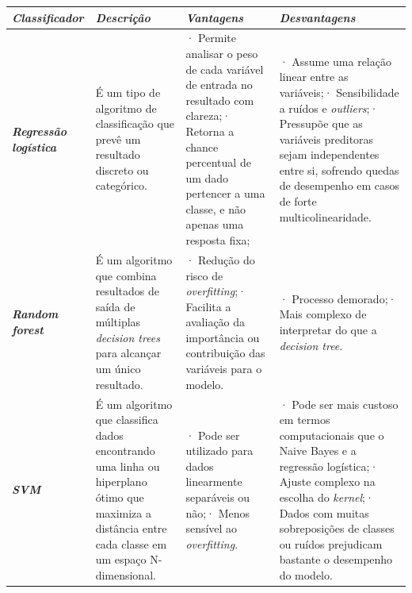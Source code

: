 \documentclass[
  brazilian,
  11pt,
]{article}
\newcounter{none} %
\begin{document}
{\def\LTcaptype{none} %
\begin{longtable}[]{@{}
  >{\raggedright\arraybackslash}p{}
  >{\raggedright\arraybackslash}p{}
  >{\raggedright\arraybackslash}p{}
  >{\raggedright\arraybackslash}p{}@{}}
\toprule\noalign{}
\textbf{\emph{Classificador}} & \textbf{\emph{Descrição}} & \textbf{\emph{Vantagens}} & \textbf{\emph{Desvantagens}} \\
\midrule\noalign{}
\endhead
\bottomrule\noalign{}
\endlastfoot
\textbf{\emph{Regressão logística}} & É um tipo de algoritmo de classificação que prevê um resultado discreto ou categórico. & · Permite analisar o peso de cada variável de entrada no resultado com clareza;\newline · Retorna a chance percentual de um dado pertencer a uma classe, e não apenas uma resposta fixa; & · Assume uma relação linear entre as variáveis;\newline · Sensibilidade a ruídos e \emph{outliers};\newline · Pressupõe que as variáveis preditoras sejam independentes entre si, sofrendo quedas de desempenho em casos de forte multicolinearidade. \\
\textbf{\emph{Random forest}} & É um algoritmo que combina resultados de saída de múltiplas \emph{decision trees} para alcançar um único resultado. & · Redução do risco de \emph{overfitting};\newline · Facilita a avaliação da importância ou contribuição das variáveis para o modelo. & · Processo demorado;\newline · Mais complexo de interpretar do que a \emph{decision tree}. \\
\textbf{\emph{SVM}} & É um algoritmo que classifica dados encontrando uma linha ou hiperplano ótimo que maximiza a distância entre cada classe em um espaço N-dimensional. & · Pode ser utilizado para dados linearmente separáveis ou não;\newline · Menos sensível ao \emph{overfitting}. & · Pode ser mais custoso em termos computacionais que o Naive Bayes e a regressão logística;\newline · Ajuste complexo na escolha do \emph{kernel};\newline · Dados com muitas sobreposições de classes ou ruídos prejudicam bastante o desempenho do modelo. \\

\end{longtable}}
\end{document}
